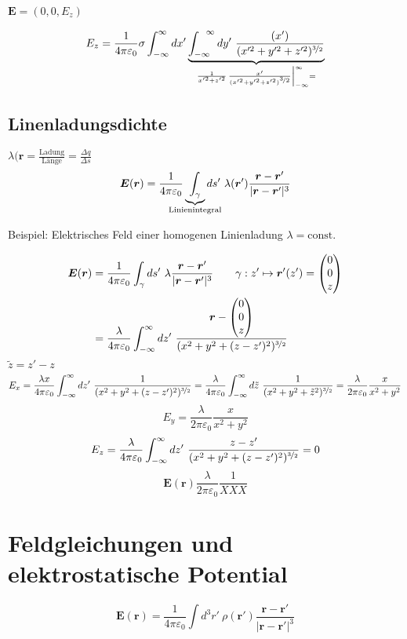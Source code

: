 \documentclass[titlepage,11pt,a4paper,ngerman]{report}
\newcommand{\tx}[1]{\textrm{#1}}
\newcommand{\const}{\tx{const.}}
\newcommand{\kq}{\frac{1}{4\pi\epsilon_0}}
\newcommand{\intt}[2]{\int_{#1}^{#2}}
\renewcommand{\vec}[1]{\boldsymbol{#1}}
\renewcommand{\epsilon}{\varepsilon}
\begin{document}
$\vec{E} = (0,0,E_z)$

$$E_z = \kq \sigma \intt{-\infty}{\infty}dx'\underbrace{\intt{-\infty}{\phantom{-}\infty}dy'\ \frac{(x')}{(x'^2 + y'^2 + z'^2)^{\nicefrac{3}{2}}}}_{\frac{1}{x'^2 +z'^2}\left.\frac{x'}{(x'^2 + y'^2 + z'^2)^{\nicefrac{3}{2}}} \right\rvert_{-\infty}^{\infty} = }$$

\subsection{Linenladungsdichte}
$\lambda(\vec{r} = \frac{\textrm{Ladung}}{\textrm{Länge}} = \frac{\Delta q}{\Delta s}$
$$\vec{E}(\vec{r}) = \kq \underbrace{\int_\gamma}_{\mathclap{\textrm{Linienintegral}}} ds'\ \lambda(\vec{r}') \frac{\vec{r} - \vec{r}'}{|\vec{r} - \vec{r}'|^3}$$

Beispiel: Elektrisches Feld einer homogenen Linienladung
$\lambda = \const$

\begin{align*}
\vec{E}(\vec{r}) &= \kq \int_\gamma ds'\ \lambda \frac{\vec{r} - \vec{r}'}{|\vec{r} - \vec{r}'|^3} \qquad \gamma: z' \mapsto \vec{r}'(z') = \begin{pmatrix} 0 \\ 0\\ z \end{pmatrix}\\
&= \frac{\lambda}{4 \pi \epsilon_0} \intt{-\infty}{\infty}dz'\ \frac{\vec{r} - \begin{pmatrix} 0 \\ 0\\ z \end{pmatrix}}{(x^2 + y^2 + (z-z')^2)^{\nicefrac{3}{2}}}
\end{align*}
$\tilde{z} = z' - z$
$$E_x = \frac{\lambda x}{4 \pi \epsilon_0}\intt{-\infty}{\infty}dz'\ \frac{1}{(x^2 + y^2 + (z-z')^2)^{\nicefrac{3}{2}}} = \frac{\lambda}{4 \pi \epsilon_0}\intt{-\infty}{\infty}d\tilde{z}\ \frac{1}{(x^2 + y^2 + \tilde{z}^2)^{\nicefrac{3}{2}}} = \frac{\lambda}{2 \pi \epsilon_0} \frac{x}{x^2 + y^2}$$
$$E_y = \frac{\lambda}{2 \pi \epsilon_0}\frac{x}{x^2 + y^2}$$
$$E_z = \frac{\lambda}{4 \pi \epsilon_0} \intt{-\infty}{\infty}dz'\ \frac{z-z'}{(x^2 + y^2 + (z-z')^2)^{\nicefrac{3}{2}}} = 0$$
$$\vec{E}(\vec{r}) \frac{\lambda}{2 \pi \epsilon_0} \frac{1}{XXX}$$

\section{Feldgleichungen und elektrostatische Potential}
$$\vec{E}(\vec{r}) = \kq \int d^3 r'\ \rho(\vec{r}') \frac{\vec{r} - \vec{r}'}{|\vec{r} - \vec{r}'|^3}$$
\end{document}

